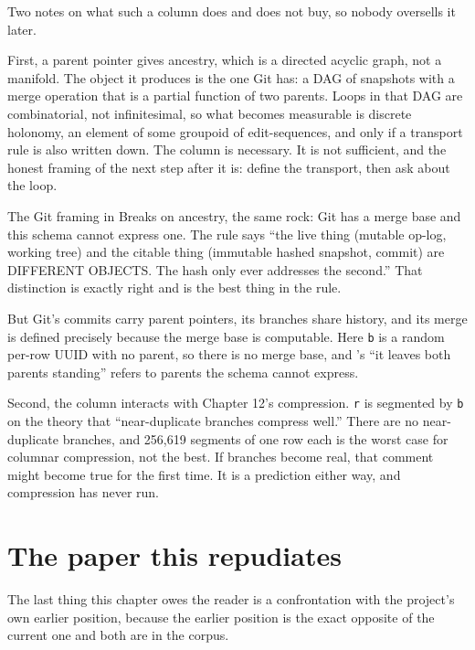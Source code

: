 Two notes on what such a column does and does not buy, so nobody oversells it later.

First, a parent pointer gives ancestry, which is a directed acyclic graph, not a manifold. The object it produces is the one Git has: a DAG of snapshots with a merge operation that is a partial function of two parents. Loops in that DAG are combinatorial, not infinitesimal, so what becomes measurable is discrete holonomy, an element of some groupoid of edit-sequences, and only if a transport rule is also written down. The column is necessary. It is not sufficient, and the honest framing of the next step after it is: define the transport, then ask about the loop.

\begin{Analogy}{The Git framing in }{Breaks on ancestry, the same rock: Git has a merge base and this schema cannot express one.}
The rule says ``the live thing (mutable op-log, working tree) and the citable thing (immutable hashed snapshot, commit) are DIFFERENT OBJECTS. The hash only ever addresses the second.'' That distinction is exactly right and is the best thing in the rule.

But Git's commits carry parent pointers, its branches share history, and its merge is defined precisely because the merge base is computable. Here \texttt{b} is a random per-row UUID with no parent, so there is no merge base, and 's ``it leaves both parents standing'' refers to parents the schema cannot express.
\end{Analogy}

Second, the column interacts with Chapter 12's compression. \texttt{r} is segmented by \texttt{b} on the theory that ``near-duplicate branches compress well.'' There are no near-duplicate branches, and 256{,}619 segments of one row each is the worst case for columnar compression, not the best. If branches become real, that comment might become true for the first time. It is a prediction either way, and compression has never run.

\section{The paper this repudiates}

The last thing this chapter owes the reader is a confrontation with the project's own earlier position, because the earlier position is the exact opposite of the current one and both are in the corpus.

